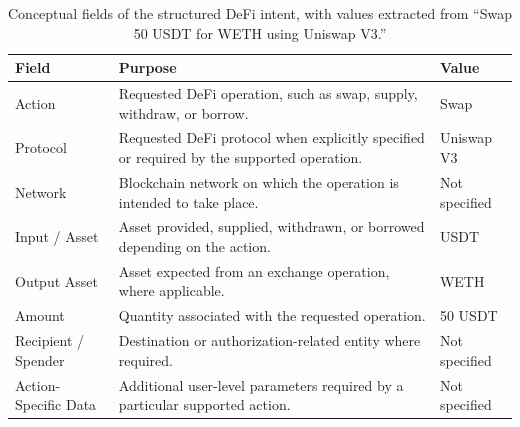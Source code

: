 





\begin{table}[H]
\centering
\small
\caption{Conceptual fields of the structured DeFi intent, with values
extracted from ``Swap 50 USDT for WETH using Uniswap V3.''}
\label{tab:structured_intent_fields}

\begin{tabular}{@{}p{} p{} p{}@{}}
\hline
\textbf{Field} & \textbf{Purpose} & \textbf{Value} \\
\hline

Action &
Requested DeFi operation, such as swap, supply, withdraw, or borrow. &
Swap \\

Protocol &
Requested DeFi protocol when explicitly specified or required by the
supported operation. &
Uniswap V3 \\

Network &
Blockchain network on which the operation is intended to take place. &
Not specified \\

Input / Asset &
Asset provided, supplied, withdrawn, or borrowed depending on the action. &
USDT \\

Output Asset &
Asset expected from an exchange operation, where applicable. &
WETH \\

Amount &
Quantity associated with the requested operation. &
50 USDT \\

Recipient / Spender &
Destination or authorization-related entity where required. &
Not specified \\

Action-Specific Data &
Additional user-level parameters required by a particular supported action. &
Not specified \\

\hline
\end{tabular}
\end{table}

